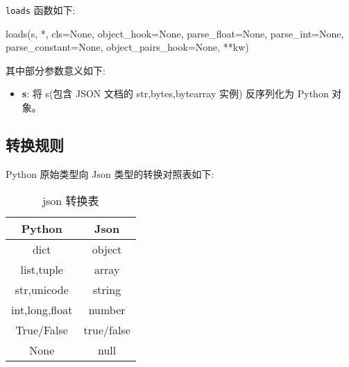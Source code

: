 \texttt{loads} 函数如下:

\begin{python}
loads(s, *, cls=None, object_hook=None, parse_float=None, parse_int=None, parse_constant=None, object_pairs_hook=None, **kw)
\end{python}

其中部分参数意义如下:
\begin{itemize}
    \item \textbf{s}: 将 s(包含 JSON 文档的 str,bytes,bytearray 实例) 反序列化为 Python 对象。
\end{itemize}

\subsection{转换规则}

Python 原始类型向 Json 类型的转换对照表如下:
\begin{table}[H]
    \centering
    \caption{json 转换表}
    \label{table:json 转换表}
    \setlength{\tabcolsep}{10mm}
    \begin{tabular}{c|c}
        \toprule
        \textbf{Python} & \textbf{Json} \\
        \midrule
        dict & object \\
        list,tuple & array \\
        str,unicode & string \\
        int,long,float & number \\
        True/False & true/false \\
        None & null \\
        \bottomrule
    \end{tabular}
\end{table}